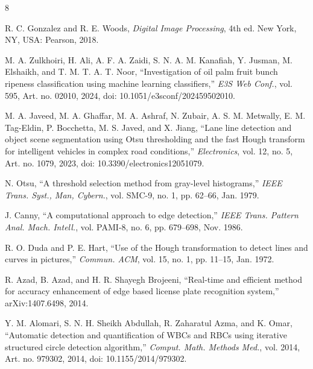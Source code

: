 \documentclass[lettersize,journal]{IEEEtran}
\begin{document}
\begin{thebibliography}{8}


R. C. Gonzalez and R. E. Woods, \textit{Digital Image Processing}, 4th ed. New York, NY, USA: Pearson, 2018.

M. A. Zulkhoiri, H. Ali, A. F. A. Zaidi, S. N. A. M. Kanafiah, Y. Jusman, M. Elshaikh, and T. M. T. A. T. Noor, ``Investigation of oil palm fruit bunch ripeness classification using machine learning classifiers,'' \textit{E3S Web Conf.}, vol. 595, Art. no. 02010, 2024, doi: 10.1051/e3sconf/202459502010.

M. A. Javeed, M. A. Ghaffar, M. A. Ashraf, N. Zubair, A. S. M. Metwally, E. M. Tag-Eldin, P. Bocchetta, M. S. Javed, and X. Jiang, ``Lane line detection and object scene segmentation using Otsu thresholding and the fast Hough transform for intelligent vehicles in complex road conditions,'' \textit{Electronics}, vol. 12, no. 5, Art. no. 1079, 2023, doi: 10.3390/electronics12051079.

N. Otsu, ``A threshold selection method from gray-level histograms,'' \textit{IEEE Trans. Syst., Man, Cybern.}, vol. SMC-9, no. 1, pp. 62--66, Jan. 1979.

J. Canny, ``A computational approach to edge detection,'' \textit{IEEE Trans. Pattern Anal. Mach. Intell.}, vol. PAMI-8, no. 6, pp. 679--698, Nov. 1986.

R. O. Duda and P. E. Hart, ``Use of the Hough transformation to detect lines and curves in pictures,'' \textit{Commun. ACM}, vol. 15, no. 1, pp. 11--15, Jan. 1972.

R. Azad, B. Azad, and H. R. Shayegh Brojeeni, ``Real-time and efficient method for accuracy enhancement of edge based license plate recognition system,'' arXiv:1407.6498, 2014.

Y. M. Alomari, S. N. H. Sheikh Abdullah, R. Zaharatul Azma, and K. Omar, ``Automatic detection and quantification of WBCs and RBCs using iterative structured circle detection algorithm,'' \textit{Comput. Math. Methods Med.}, vol. 2014, Art. no. 979302, 2014, doi: 10.1155/2014/979302.

\end{thebibliography}
\end{document}
